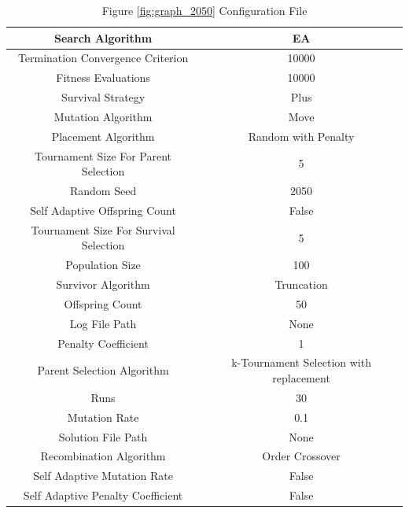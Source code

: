 \documentclass{standalone}
\begin{document}
\begin{table}[!htb]
	\centering
	\caption{Figure \ref{fig:graph_2050} Configuration File}
	\label{tab:graph_2050}
	\begin{tabular}{| c | c |}
		\hline
		Search Algorithm		& EA		 \\
		\hline
		Termination Convergence Criterion		& 10000		 \\
		\hline
		Fitness Evaluations		& 10000		 \\
		\hline
		Survival Strategy		& Plus		 \\
		\hline
		Mutation Algorithm		& Move		 \\
		\hline
		Placement Algorithm		& Random with Penalty		 \\
		\hline
		Tournament Size For Parent Selection		& 5		 \\
		\hline
		Random Seed		& 2050		 \\
		\hline
		Self Adaptive Offspring Count		& False		 \\
		\hline
		Tournament Size For Survival Selection		& 5		 \\
		\hline
		Population Size		& 100		 \\
		\hline
		Survivor Algorithm		& Truncation		 \\
		\hline
		Offspring Count		& 50		 \\
		\hline
		Log File Path		& None		 \\
		\hline
		Penalty Coefficient		& 1		 \\
		\hline
		Parent Selection Algorithm		& k-Tournament Selection with replacement		 \\
		\hline
		Runs		& 30		 \\
		\hline
		Mutation Rate		& 0.1		 \\
		\hline
		Solution File Path		& None		 \\
		\hline
		Recombination Algorithm		& Order Crossover		 \\
		\hline
		Self Adaptive Mutation Rate		& False		 \\
		\hline
		Self Adaptive Penalty Coefficient		& False		 \\
		\hline
	\end{tabular}
\end{table}
\end{document}
